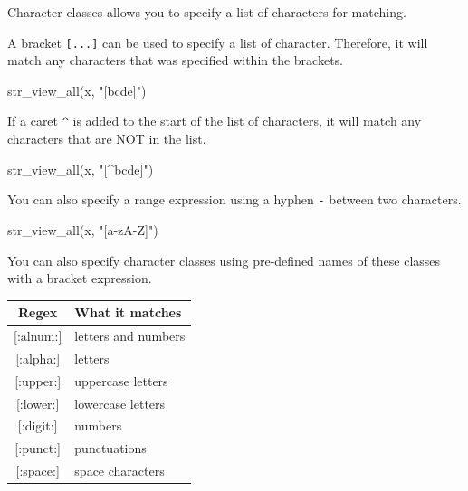 \documentclass[
]{book}
\newenvironment{Shaded}{\begin{snugshade}}{\end{snugshade}}
\newcommand{\FunctionTok}[1]{\textcolor[rgb]{0.00,0.00,0.00}{#1}}
\newcommand{\NormalTok}[1]{#1}
\newcommand{\StringTok}[1]{\textcolor[rgb]{0.31,0.60,0.02}{#1}}
\begin{document}
Character classes allows you to specify a list of characters for matching.

A bracket \texttt{{[}...{]}} can be used to specify a list of character. Therefore, it will match any characters that was specified within the brackets.

\begin{Shaded}
\begin{Highlighting}[]
\FunctionTok{str\_view\_all}\NormalTok{(x, }\StringTok{"[bcde]"}\NormalTok{)}
\end{Highlighting}
\end{Shaded}

If a caret \texttt{\^{}} is added to the start of the list of characters, it will match any characters that are NOT in the list.

\begin{Shaded}
\begin{Highlighting}[]
\FunctionTok{str\_view\_all}\NormalTok{(x, }\StringTok{"[\^{}bcde]"}\NormalTok{)}
\end{Highlighting}
\end{Shaded}

You can also specify a range expression using a hyphen \texttt{-} between two characters.

\begin{Shaded}
\begin{Highlighting}[]
\FunctionTok{str\_view\_all}\NormalTok{(x, }\StringTok{"[a{-}zA{-}Z]"}\NormalTok{)}
\end{Highlighting}
\end{Shaded}

You can also specify character classes using pre-defined names of these classes with a bracket expression.

\begin{longtable}[]{@{}cl@{}}
\toprule
Regex & What it matches \\
\midrule
\endhead
{[}:alnum:{]} & letters and numbers \\
{[}:alpha:{]} & letters \\
{[}:upper:{]} & uppercase letters \\
{[}:lower:{]} & lowercase letters \\
{[}:digit:{]} & numbers \\
{[}:punct:{]} & punctuations \\
{[}:space:{]} & space characters \\
\bottomrule
\end{longtable}
\end{document}
